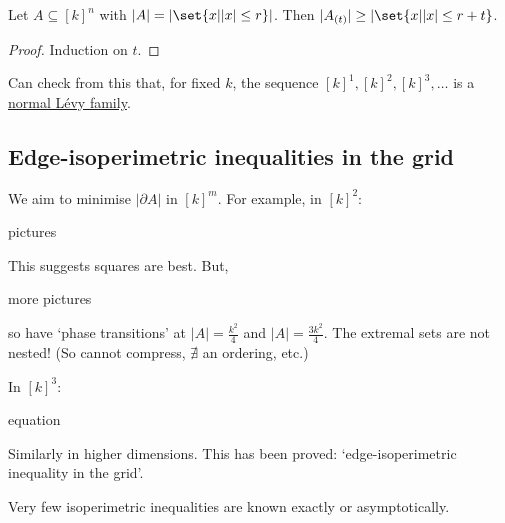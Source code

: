 \documentclass{article}
\let\subset\subseteq
\begin{document}
\begin{ncor}\label{cor:2.11}
  Let $A \subset [k]^n$ with $|A| = |\set{x | |x| \leq r}|$. Then $|A_{(t)}| \geq |\set{x | |x| \leq r + t}$.
\end{ncor}
\begin{proof}
  Induction on $t$.
\end{proof}
\begin{remark}
  Can check from this that, for fixed $k$, the sequence $[k]^1, [k]^2, [k]^3, \dotsc$ is a \hyperlink{def:levyfam}{normal L\'evy family}.
\end{remark}
\subsection{Edge-isoperimetric inequalities in the grid}
We aim to minimise $|\partial A|$ in $[k]^m$.
For example, in $[k]^2$:
\begin{center}
  pictures
\end{center}
This suggests squares are best.
But,
\begin{center}
  more pictures
\end{center}
so have `phase transitions' at $|A| = \frac{k^2}{4}$ and $|A| = \frac{3k^2}{4}$.
The extremal sets are not nested! (So cannot compress, $\nexists$ an ordering, etc.)

In $[k]^3$:
\begin{center}
  equation
\end{center}

Similarly in higher dimensions.
This has been proved: `edge-isoperimetric inequality in the grid'.

Very few isoperimetric inequalities are known exactly or asymptotically.
\clearpage
\end{document}
